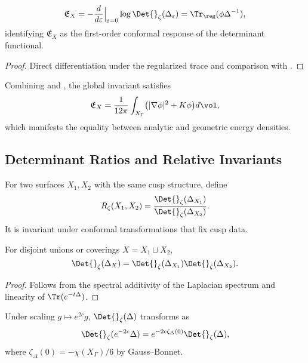 \begin{proposition}\label{prop:invariant-link}\relax
\[
\mathfrak{E}_X = -\frac{d}{d\varepsilon}\Big|_{\varepsilon=0}\log\Det{}_\zeta(\Delta_\varepsilon)
= \Tr_\reg(\phi\Delta^{-1}),
\]
identifying $\mathfrak{E}_X$ as the first-order conformal response of the determinant functional. %
\end{proposition}

\begin{proof}\relax
Direct differentiation under the regularized trace and comparison with . %
\end{proof}

\begin{remark}\label{rem:energy-id}\relax
Combining  and , the global invariant satisfies
\[
\mathfrak{E}_X = \frac{1}{12\pi}\int_{X_\Gamma}\!\big(|\nabla\phi|^2 + K\phi\big)d\vol,
\]
which manifests the equality between analytic and geometric energy densities. %
\end{remark}

\subsection{Determinant Ratios and Relative Invariants}\relax\hspace{0pt}
\label{subsec:ratios}\relax\hspace{0pt}

\begin{definition}\label{def:rel-det}\relax
For two surfaces $X_1,X_2$ with the same cusp structure, define
\[
R_\zeta(X_1,X_2)=\frac{\Det{}_\zeta(\Delta_{X_1})}{\Det{}_\zeta(\Delta_{X_2})}.
\]
It is invariant under conformal transformations that fix cusp data. %
\end{definition}

\begin{lemma}[Multiplicativity]\label{lem:multiplicativity}\relax
For disjoint unions or coverings $X=X_1\sqcup X_2$,
\[
\Det{}_\zeta(\Delta_X)=\Det{}_\zeta(\Delta_{X_1})\Det{}_\zeta(\Delta_{X_2}).
\]
\end{lemma}

\begin{proof}\relax
Follows from the spectral additivity of the Laplacian spectrum and linearity of $\Tr(e^{-t\Delta})$. %
\end{proof}

\begin{remark}\label{rem:conf-cov}\relax
Under scaling $g\mapsto e^{2c}g$, $\Det{}_\zeta(\Delta)$ transforms as
\[
\Det{}_\zeta(e^{-2c}\Delta)=e^{-2c\zeta_\Delta(0)}\Det{}_\zeta(\Delta),
\]
where $\zeta_\Delta(0)=-\chi(X_\Gamma)/6$ by Gauss–Bonnet. %
\end{remark}

